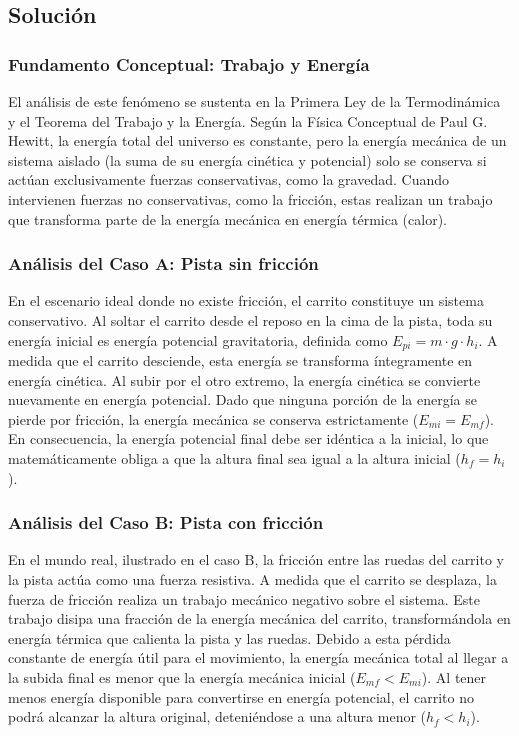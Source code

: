 \documentclass[12pt,a4paper]{article}
\begin{document}
\subsection*{Solución}

\subsubsection*{Fundamento Conceptual: Trabajo y Energía}
El análisis de este fenómeno se sustenta en la Primera Ley de la Termodinámica y el Teorema del Trabajo y la Energía. Según la Física Conceptual de Paul G. Hewitt, la energía total del universo es constante, pero la energía mecánica de un sistema aislado (la suma de su energía cinética y potencial) solo se conserva si actúan exclusivamente fuerzas conservativas, como la gravedad. Cuando intervienen fuerzas no conservativas, como la fricción, estas realizan un trabajo que transforma parte de la energía mecánica en energía térmica (calor).

\subsubsection*{Análisis del Caso A: Pista sin fricción}
En el escenario ideal donde no existe fricción, el carrito constituye un sistema conservativo. Al soltar el carrito desde el reposo en la cima de la pista, toda su energía inicial es energía potencial gravitatoria, definida como $E_{pi} = m \cdot g \cdot h_i$. A medida que el carrito desciende, esta energía se transforma íntegramente en energía cinética. Al subir por el otro extremo, la energía cinética se convierte nuevamente en energía potencial. Dado que ninguna porción de la energía se pierde por fricción, la energía mecánica se conserva estrictamente ($E_{mi} = E_{mf}$). En consecuencia, la energía potencial final debe ser idéntica a la inicial, lo que matemáticamente obliga a que la altura final sea igual a la altura inicial ($h_f = h_i$).

\subsubsection*{Análisis del Caso B: Pista con fricción}
En el mundo real, ilustrado en el caso B, la fricción entre las ruedas del carrito y la pista actúa como una fuerza resistiva. A medida que el carrito se desplaza, la fuerza de fricción realiza un trabajo mecánico negativo sobre el sistema. Este trabajo disipa una fracción de la energía mecánica del carrito, transformándola en energía térmica que calienta la pista y las ruedas. Debido a esta pérdida constante de energía útil para el movimiento, la energía mecánica total al llegar a la subida final es menor que la energía mecánica inicial ($E_{mf} < E_{mi}$). Al tener menos energía disponible para convertirse en energía potencial, el carrito no podrá alcanzar la altura original, deteniéndose a una altura menor ($h_f < h_i$).
\end{document}
